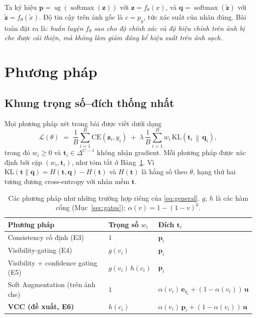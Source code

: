 \documentclass[11pt,a4paper]{article}
\theoremstyle{plain}
\theoremstyle{definition}
\theoremstyle{remark}
\newcommand{\Simplex}{\Delta^{C-1}}
\newcommand{\KL}{\mathrm{KL}}
\newcommand{\CE}{\mathrm{CE}}
\newcommand{\sg}{\operatorname{sg}}
\newcommand{\softmax}{\operatorname{softmax}}
\newcommand{\bp}{\bm{p}}
\newcommand{\bq}{\bm{q}}
\newcommand{\bt}{\bm{t}}
\newcommand{\bu}{\bm{u}}
\newcommand{\bz}{\bm{z}}
\newcommand{\be}{\bm{e}}
\newcommand{\xt}{\tilde{x}}
\newcommand{\zt}{\tilde{\bz}}
\begin{document}
Ta ký hiệu $\bp=\sg(\softmax(\bz))$ với $\bz=f_\theta(x)$, và $\bq=\softmax(\zt)$ với $\zt=f_\theta(\xt)$. Độ tin cậy trên ảnh gốc là $c=p_y$, tức xác suất của nhãn đúng. Bài toán đặt ra là: \emph{huấn luyện $f_\theta$ sao cho độ chính xác và độ hiệu chỉnh trên ảnh bị che được cải thiện, mà không làm giảm đáng kể hiệu suất trên ảnh sạch.}

\section{Phương pháp}
\label{sec:method}

\subsection{Khung trọng số--đích thống nhất}
\label{sec:framework}

Mọi phương pháp xét trong bài được viết dưới dạng
\begin{equation}
  \label{eq:general}
  \mathcal{L}(\theta) \;=\; \frac{1}{B}\sum_{i=1}^{B}\CE(\bz_i,y_i)
  \;+\;\lambda\,\frac{1}{B}\sum_{i=1}^{B} w_i\,\KL\!\left(\bt_i \,\middle\|\, \bq_i\right),
\end{equation}
trong đó $w_i\ge 0$ và $\bt_i\in\Simplex$ không nhận gradient. Mỗi phương pháp được xác định bởi cặp $(w_i,\bt_i)$, như tóm tắt ở Bảng~\ref{tab:framework}. Vì $\KL(\bt\|\bq)=H(\bt,\bq)-H(\bt)$ và $H(\bt)$ là hằng số theo $\theta$, hạng thứ hai tương đương cross-entropy với nhãn mềm $\bt$.

\begin{table}[t]
\centering
\caption{Các phương pháp như những trường hợp riêng của \eqref{eq:general}. $g$, $h$ là các hàm cổng (Mục~\ref{sec:gates}); $\alpha(v)=1-(1-v)^k$.}
\label{tab:framework}
\begin{tabular}{@{}lll@{}}
\toprule
Phương pháp & Trọng số $w_i$ & Đích $\bt_i$ \\
\midrule
Consistency cố định (E3) & $1$ & $\bp_i$ \\
Visibility-gating (E4) & $g(v_i)$ & $\bp_i$ \\
Visibility + confidence gating (E5) & $g(v_i)\,h(c_i)$ & $\bp_i$ \\
Soft Augmentation \cite{liu2023soft} (trên ảnh che) & $1$ & $\alpha(v_i)\,\be_{y_i}+(1-\alpha(v_i))\,\bu$ \\
\textbf{VCC (đề xuất, E6)} & $h(c_i)$ & $\alpha(v_i)\,\bp_i+(1-\alpha(v_i))\,\bu$ \\
\bottomrule
\end{tabular}
\end{table}
\end{document}
